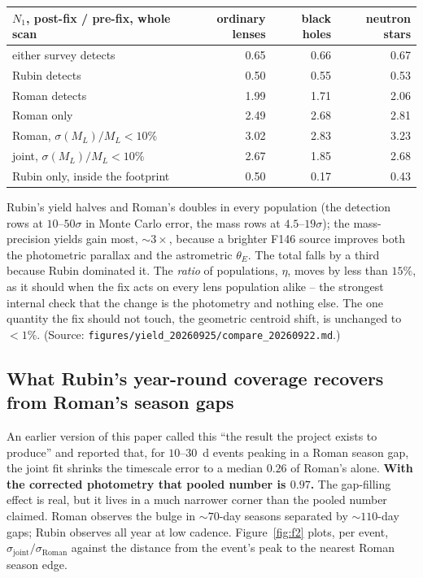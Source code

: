 \documentclass[english,10pt,a4paper]{article}
\begin{document}
	\begin{center}
	\begin{tabular}{lrrr}
		\toprule
		$N_1$, post-fix / pre-fix, whole scan & ordinary lenses & black holes & neutron stars \\
		\midrule
		either survey detects          & 0.65 & 0.66 & 0.67 \\
		Rubin detects                  & 0.50 & 0.55 & 0.53 \\
		Roman detects                  & 1.99 & 1.71 & 2.06 \\
		Roman only                     & 2.49 & 2.68 & 2.81 \\
		Roman, $\sigma(M_L)/M_L<10\%$  & 3.02 & 2.83 & 3.23 \\
		joint, $\sigma(M_L)/M_L<10\%$  & 2.67 & 1.85 & 2.68 \\
		Rubin only, inside the footprint & 0.50 & 0.17 & 0.43 \\
		\bottomrule
	\end{tabular}
	\end{center}

	\noindent Rubin's yield halves and Roman's doubles in every population (the detection rows at $10$--$50\sigma$ in Monte Carlo error, the mass rows at $4.5$--$19\sigma$); the mass-precision yields gain most, $\sim\!3\times$, because a brighter F146 source improves both the photometric parallax and the astrometric $\theta_E$. The total falls by a third because Rubin dominated it. The \emph{ratio} of populations, $\eta$, moves by less than $15\%$, as it should when the fix acts on every lens population alike -- the strongest internal check that the change is the photometry and nothing else. The one quantity the fix should not touch, the geometric centroid shift, is unchanged to $<1\%$. (Source: \texttt{figures/yield\_20260925/compare\_20260922.md}.)

	\subsection{What Rubin's year-round coverage recovers from Roman's season gaps}
	\label{subsec:gapfill}

	An earlier version of this paper called this ``the result the project exists to produce'' and reported that, for $10$--$30$~d events peaking in a Roman season gap, the joint fit shrinks the timescale error to a median $0.26$ of Roman's alone. \textbf{With the corrected photometry that pooled number is $0.97$.} The gap-filling effect is real, but it lives in a much narrower corner than the pooled number claimed. Roman observes the bulge in $\sim$$70$-day seasons separated by $\sim$$110$-day gaps; Rubin observes all year at low cadence. Figure~\ref{fig:f2} plots, per event, $\sigma_{\mathrm{joint}}/\sigma_{\mathrm{Roman}}$ against the distance from the event's peak to the nearest Roman season edge.
\end{document}
